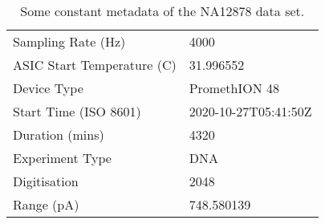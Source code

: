 \begin{table}
    \caption{\label{tab:data-meta}Some constant metadata of the NA12878 data set.}
    \begin{tabular}{|l|l|}%
        \hline
	    Sampling Rate (Hz) & 4000\\
	ASIC Start Temperature (\textdegree C) & 31.996552\\
	Device Type & PromethION 48\\
	    Start Time (ISO 8601) & 2020-10-27T05:41:50Z\\
	    Duration (mins) & 4320\\
	    Experiment Type & DNA\\
	    Digitisation & 2048\\
	    Range (pA) & 748.580139\\
	\hline
    \end{tabular}
\end{table}

